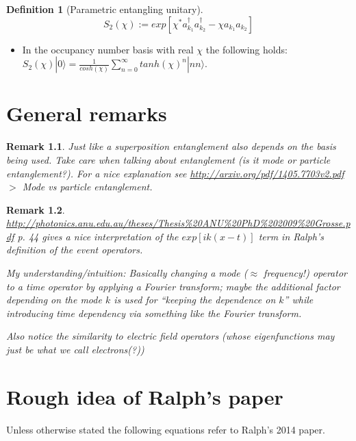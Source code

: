 \documentclass[11pt]{report}
\newtheorem{definition}{Definition}[chapter]
\newtheorem*{remark}{Remark}
\begin{document}
\begin{definition}[Parametric entangling unitary]
	$$S_2(\chi) := exp[\chi^*a_{k_1}^\dagger a_{k_2}^\dagger - \chi a_{k_1}a_{k_2}]$$
\end{definition}

\begin{itemize}
	\item In the occupancy number basis with real $\chi$ the following holds: $S_2(\chi)|0\rangle = \frac{1}{cosh(\chi)}\sum_{n=0}^\infty tanh(\chi)^n |nn\rangle$.
\end{itemize}


\chapter{General remarks}

\begin{remark}
	Just like a superposition entanglement also depends on the basis being used. Take care when talking about entanglement (is it mode or particle entanglement?). For a nice explanation see \url{http://arxiv.org/pdf/1405.7703v2.pdf} $>$ Mode vs particle entanglement. 
\end{remark}

\begin{remark}
	\url{http://photonics.anu.edu.au/theses/Thesis\%20ANU\%20PhD\%202009\%20Grosse.pdf} p. 44 gives a nice interpretation of the $exp[ik(x-t)]$ term in Ralph's definition of the event operators.
	
	My understanding/intuition: Basically changing a mode ($\approx$ frequency!) operator to a time operator by applying a Fourier transform; maybe the additional factor depending on the mode $k$ is used for ``keeping the dependence on $k$'' while introducing time dependency via something like the Fourier transform.
	
	Also notice the similarity to electric field operators (whose eigenfunctions may just be what we call electrons(?))
\end{remark}

\chapter{Rough idea of Ralph's paper}
Unless otherwise stated the following equations refer to Ralph's 2014 paper.
\end{document}
